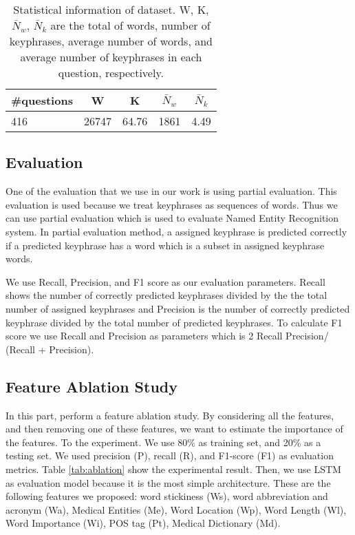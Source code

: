 \begin{table}
	\caption{Statistical information of dataset. W, K, $\bar{N}_{w}$, $\bar{N}_{k}$ are the total of words, number of keyphrases, average number of words, and average number of keyphrases in each question, respectively.}
	\label{tab:descriptive_stats}
	\begin{tabular}{lcccc}
		\toprule
		\#questions&W&K&$\bar{N}_{w}$&$\bar{N}_{k}$\\
		\midrule
		416 & 26747  & 64.76 & 1861 & 4.49 \\
		
		\bottomrule
	\end{tabular}
\end{table}
\subsection{Evaluation}
One of the evaluation that we use in our work is using partial evaluation. This evaluation is used because we treat keyphrases as sequences of words. Thus we can use partial evaluation which is used to evaluate Named Entity Recognition system. In partial evaluation method, a assigned keyphrase is predicted correctly if a predicted keyphrase has a word which is a subset in assigned keyphrase words. 

We use Recall, Precision, and F1 score as our evaluation parameters. Recall shows the number of correctly predicted keyphrases divided by the the total number of assigned keyphrases and Precision is the number of correctly predicted keyphrase divided by the total number of predicted keyphrases. To calculate F1 score we use Recall and Precision as parameters which is 2  Recall  Precision/ (Recall + Precision).
\iffalse
\subsection{Feature Ablation Study}
In this part, perform a feature ablation study. By considering all the features, and then removing one of these features, we want to estimate the importance of the features. To the experiment. We use 80\% as training set, and 20\% as a testing set. We used precision (P), recall (R), and F1-score (F1) as evaluation metrics. Table \ref{tab:ablation} show the experimental result. Then, we use LSTM as evaluation model because it is the most simple architecture. These are the following features we proposed: word stickiness (Ws), word abbreviation and acronym (Wa), Medical Entities (Me), Word Location (Wp), Word Length (Wl), Word Importance (Wi), POS tag (Pt), Medical Dictionary (Md).

